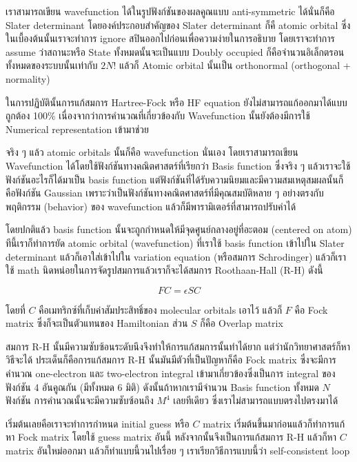 เราสามารถเขียน wavefunction ได้ในรูปฟังก์ชันของผลคูณแบบ anti-symmetric ได้นั่นก็คือ Slater determinant
โดยองค์ประกอบสำคัญของ Slater determinant ก็คื atomic orbital ซึ่งในเบื้องต้นนั้นเราจะทำการ ignore
สปินออกไปก่อนเพื่อความง่ายในการอธิบาย โดยเราจะทำการ assume ว่าสถานะหรือ State ทั้งหมดนั้นจะเป็นแบบ
Doubly occupied ก็คือจำนวนอิเล็กตรอนทั้งหมดของระบบนั้นเท่ากับ $2N!$ แล้วก็ Atomic orbital
นั้นเป็น orthonormal (orthogonal + normality)

ในการปฏิบัตินั้นการแก้สมการ Hartree-Fock หรือ HF equation ยังไม่สามารถแก้ออกมาได้แบบถูกต้อง 100\%
เนื่องจากว่าการคำนวณที่เกี่ยวข้องกับ Wavefunction นั้นยังต้องมีการใช้ Numerical representation เข้ามาช่วย

จริง ๆ แล้ว atomic orbitals นั้นก็คือ wavefunction นั่นเอง โดยเราสามารถเขียน Wavefunction
ได้โดยใช้ฟังก์ชันทางคณิตศาสตร์ที่เรียกว่า Basis function ซึ่งจริง ๆ แล้วเราจะใช้ฟังก์ชันอะไรก็ได้มาเป็น
basis function แต่ฟังก์ชันที่ได้รับความนิยมและมีความสมเหตุสมผลนั้นก็คือฟังก์ชัน Gaussian
เพราะว่าเป็นฟังก์ชันทางคณิตศาสตร์ที่มีคุณสมบัติหลาย ๆ อย่างตรงกับพฤติกรรม (behavior) ของ wavefunction
แล้วก็มีพารามิเตอร์ที่สามารถปรับค่าได้

โดยปกติแล้ว basis function นั้นจะถูกกำหนดให้มีจุดศูนย์กลางอยู่ที่อะตอม (centered on atom)
ทีนี้เราก็ทำการยัด atomic orbital (wavefunction) ที่เราใช้ basis function เข้าไปใน Slater
determinant แล้วก็เอาใส่เข้าไปใน variation equation (หรือสมการ Schrodinger)
แล้วก็เราใช้ math นิดหน่อยในการจัดรูปสมการแล้วเราก็จะได้สมการ Roothaan-Hall (R-H) ดังนี้

\begin{equation}
    FC = \epsilon SC
\end{equation}

โดยที่ $C$ คือเมทริกซ์ที่เก็บค่าสัมประสิทธิ์ของ molecular orbitals เอาไว้ แล้วก็ $F$ คือ Fock matrix
ซึ่งก็จะเป็นตัวแทนของ Hamiltonian ส่วน $S$ ก็คือ Overlap matrix

สมการ R-H นั้นมีความซับซ้อนระดับนึงจึงทำให้การแก้สมการนั้นทำได้ยาก แต่ว่านักวิทยาศาสตร์ก็หาวิธีจะได้
ประเด็นก็คือการแก้สมการ R-H นั้นมันมีตัวที่เป็นปัญหาก็คือ Fock matrix ซึ่งจะมีการคำนวณ one-electron
และ two-electron integral เข้ามาเกี่ยวข้องซึ่งเป็นการ integral ของฟังก์ชัน 4 อันคูณกัน
(มีทั้งหมด 6 มิติ) ดังนั้นถ้าหากเรามีจำนวน Basis function ทั้งหมด $N$ ฟังก์ชัน
การคำนวณนั้นจะมีความซับซ้อนถึง $M^{4}$ เลยทีเดียว ซึ่งเราไม่สามารถแบบตรงไปตรงมาได้

เริ่มต้นเลยคือเราจะทำการกำหนด initial guess หรือ $C$ matrix เริ่มต้นขึ้นมาก่อนแล้วก็ทำการแก้หา
Fock matrix โดยใช้ guess matrix อันนี้ หลังจากนั้นจึงเป็นการแก้สมการ R-H แล้วก็หา $C$ matrix
อันใหม่ออกมา แล้วก็ทำแบบนี้วนไปเรื่อย ๆ เราเรียกวิธีการแบบนี้ว่า self-consistent loop

